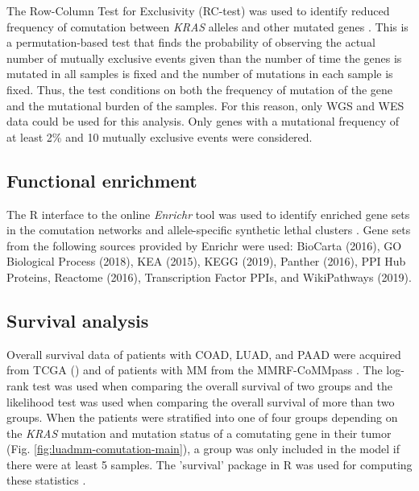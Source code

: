 \documentclass[english, 10pt, letterpaper]{article}
\newcommand{\KRAS}{\emph{KRAS}}
\begin{document}
The Row-Column Test for Exclusivity (RC-test) was used to identify reduced frequency of comutation between \KRAS{} alleles and other mutated genes \cite{Leiserson2016}. 
This is a permutation-based test that finds the probability of observing the actual number of mutually exclusive events given than the number of time the genes is mutated in all samples is fixed and the number of mutations in each sample is fixed.
Thus, the test conditions on both the frequency of mutation of the gene and the mutational burden of the samples.
For this reason, only WGS and WES data could be used for this analysis.
Only genes with a mutational frequency of at least 2\% and 10 mutually exclusive events were considered.


\subsection*{Functional enrichment}
The R interface to the online \emph{Enrichr} tool was used to identify enriched gene sets in the comutation networks and allele-specific synthetic lethal clusters \cite{Chen2013, Kuleshov2016Enrichr:Update., R-enrichR}.
Gene sets from the following sources provided by Enrichr were used: BioCarta (2016), GO Biological Process (2018), KEA (2015), KEGG (2019), Panther (2016), PPI Hub Proteins, Reactome (2016), Transcription Factor PPIs, and WikiPathways (2019).


\subsection*{Survival analysis}
Overall survival data of patients with COAD, LUAD, and PAAD were acquired from TCGA (\cite{CancerGenomeAtlasNetwork2012, CancerGenomeAtlasResearchNetwork2014, CancerGenomeAtlasResearchNetwork.Electronicaddress:andrew_aguirredfci.harvard.edu2017}) and of patients with MM from the MMRF-CoMMpass \cite{Walker2019AAnalysis.}.
The log-rank test was used when comparing the overall survival of two groups and the likelihood test was used when comparing the overall survival of more than two groups.
When the patients were stratified into one of four groups depending on the \KRAS{} mutation and mutation status of a comutating gene in their tumor (Fig. \ref{fig:luadmm-comutation-main}), a group was only included in the model if there were at least 5 samples.
The 'survival' package in R was used for computing these statistics \cite{survival-package}.
\end{document}
